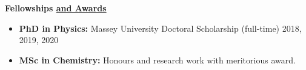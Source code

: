 {\bf\Large Fellowships \href{.}{and Awards}}

\begin{itemize}
    \itemsep-1mm
    \item {\bf PhD in Physics:} Massey University Doctoral Scholarship (full-time)
          2018, 2019, 2020
    \item {\bf MSc in Chemistry:} Honours and research work with
          meritorious award.
\end{itemize}
